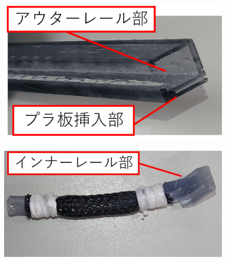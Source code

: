 \begin{figure}[t]
  \begin{minipage}{0.5\hsize}
    \centering  
    \includegraphics[scale=0.16]{image/syuseki_yobi.png}
    \label{fig:pken}
  \end{minipage}
  \begin{minipage}{0.5\hsize}
    \centering
    \includegraphics[scale=0.16]{image/syuseki_yobi2.jpg}
    \label{fig:ptanbu}
  \end{minipage}\\


\end{figure}

